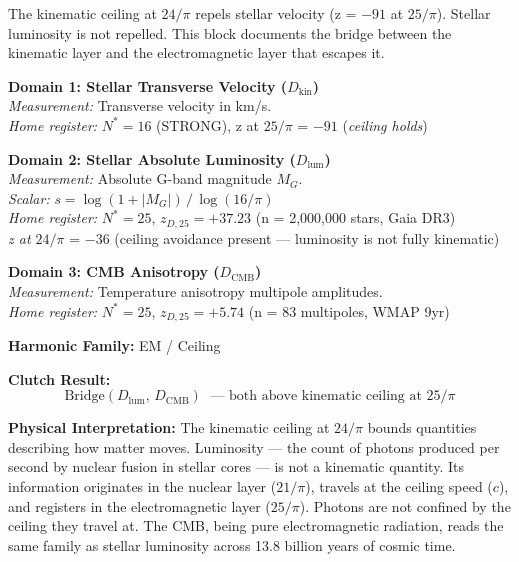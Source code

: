 \documentclass[12pt,oneside]{book}
\begin{document}
\vspace{1em}

\begin{tcolorbox}[colback=orange!5, colframe=orange!60!black,
    fonttitle=\bfseries,
    title=Rosetta Block 3 — The EM Escape: Luminosity Above the Kinematic Ceiling]

The kinematic ceiling at $24/\pi$ repels stellar velocity (z = $-91$ at $25/\pi$).
Stellar luminosity is not repelled. This block documents the bridge between the
kinematic layer and the electromagnetic layer that escapes it.

\medskip
\textbf{Domain 1: Stellar Transverse Velocity ($D_\text{kin}$)}\\
\textit{Measurement:} Transverse velocity in km/s.\\
\textit{Home register:} $N^* = 16$ (STRONG), z at $25/\pi$ = $-91$ (\textit{ceiling holds})

\medskip
\textbf{Domain 2: Stellar Absolute Luminosity ($D_\text{lum}$)}\\
\textit{Measurement:} Absolute G-band magnitude $M_G$.\\
\textit{Scalar:} $s = \log(1 + |M_G|)\,/\,\log(16/\pi)$\\
\textit{Home register:} $N^* = 25$, \quad$z_{D,25} = +37.23$ \quad(n = 2{,}000{,}000 stars, Gaia DR3)\\
\textit{z at $24/\pi$} = $-36$ (ceiling avoidance present — luminosity is not fully kinematic)

\medskip
\textbf{Domain 3: CMB Anisotropy ($D_\text{CMB}$)}\\
\textit{Measurement:} Temperature anisotropy multipole amplitudes.\\
\textit{Home register:} $N^* = 25$, \quad$z_{D,25} = +5.74$ \quad(n = 83 multipoles, WMAP 9yr)

\medskip
\textbf{Harmonic Family:} EM / Ceiling

\medskip
\textbf{Clutch Result:}
\[
\text{Bridge}(D_\text{lum},\, D_\text{CMB}) \;\text{ — both above kinematic ceiling at } 25/\pi
\]

\textbf{Physical Interpretation:} The kinematic ceiling at $24/\pi$ bounds quantities
describing how matter moves. Luminosity — the count of photons produced per second
by nuclear fusion in stellar cores — is not a kinematic quantity. Its information
originates in the nuclear layer ($21/\pi$), travels at the ceiling speed ($c$), and
registers in the electromagnetic layer ($25/\pi$). Photons are not confined by the
ceiling they travel at. The CMB, being pure electromagnetic radiation, reads the same
family as stellar luminosity across 13.8 billion years of cosmic time.

\end{tcolorbox}
\end{document}

